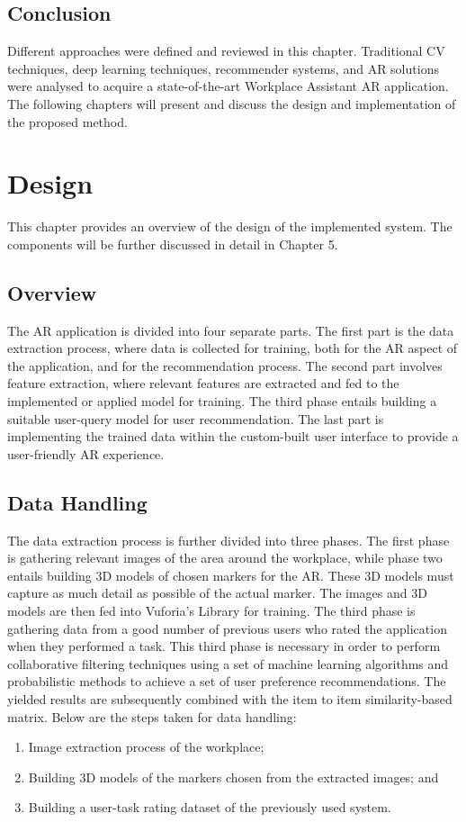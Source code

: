 \documentclass{aifyp}
\begin{document}
\subsection{Conclusion}
\indent Different approaches were defined and reviewed in this chapter. Traditional CV techniques, deep learning techniques, recommender systems, and AR solutions were analysed to acquire a state-of-the-art Workplace Assistant AR application. The following chapters will present and discuss the design and implementation of the proposed method.
\newpage
\section{Design}
\indent This chapter provides an overview of the design of the implemented system. The components will be further discussed in detail in Chapter 5.
\subsection{Overview}
\indent The AR application is divided into four separate parts. The first part is the data extraction process, where data is collected for training, both for the AR aspect of the application, and for the recommendation process. The second part involves feature extraction, where relevant features are extracted and fed to the implemented or applied model for training. The third phase entails building a suitable user-query model for user recommendation. The last part is implementing the trained data within the custom-built user interface to provide a user-friendly AR experience.
\subsection{Data Handling}
\indent The data extraction process is further divided into three phases. The first phase is gathering relevant images of the area around the workplace, while phase two entails building 3D models of chosen markers for the AR. These 3D models must capture as much detail as possible of the actual marker. The images and 3D models are then fed into Vuforia’s Library for training. The third phase is gathering data from a good number of previous users who rated the application when they performed a task. This third phase is necessary in order to perform collaborative filtering techniques using a set of machine learning algorithms and probabilistic methods to achieve a set of user preference recommendations. The yielded results are subsequently combined with the item to item similarity-based matrix. Below are the steps taken for data handling:
\begin{enumerate}
\item Image extraction process of the workplace;
\item Building 3D models of the markers chosen from the extracted images; and
\item Building a user-task rating dataset of the previously used system.
\end{enumerate}
\end{document}
